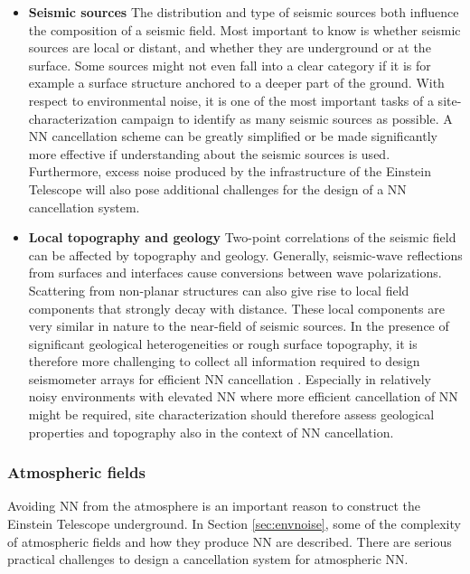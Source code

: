 \begin{itemize}
\item {\bf Seismic sources}\; The distribution and type of seismic sources both influence the composition of a seismic field. Most important to know is whether seismic sources are local or distant, and whether they are underground or at the surface. Some sources might not even fall into a clear category if it is for example a surface structure anchored to a deeper part of the ground. With respect to environmental noise, it is one of the most important tasks of a site-characterization campaign to identify as many seismic sources as possible. A NN cancellation scheme can be greatly simplified or be made significantly more effective if understanding about the seismic sources is used. Furthermore, excess noise produced by the infrastructure of the Einstein Telescope will also pose additional challenges for the design of a NN cancellation system. 

\item {\bf Local topography and geology}\; Two-point correlations of the seismic field can be affected by topography and geology. Generally, seismic-wave reflections from surfaces and interfaces cause conversions between wave polarizations. Scattering from non-planar structures can also give rise to local field components that strongly decay with distance. These local components are very similar in nature to the near-field of seismic sources. In the presence of significant geological heterogeneities or rough surface topography, it is therefore more challenging to collect all information required to design seismometer arrays for efficient NN cancellation \cite{CoHa2012}. Especially in relatively noisy environments with elevated NN where more efficient cancellation of NN might be required, site characterization should therefore assess geological properties and topography also in the context of NN cancellation.

\end{itemize}

\subsubsection*{Atmospheric fields}
Avoiding NN from the atmosphere is an important reason to construct the Einstein Telescope underground. In Section \ref{sec:envnoise}, some of the complexity of atmospheric fields and how they produce NN are described. There are serious practical challenges to design a cancellation system for atmospheric NN. 

